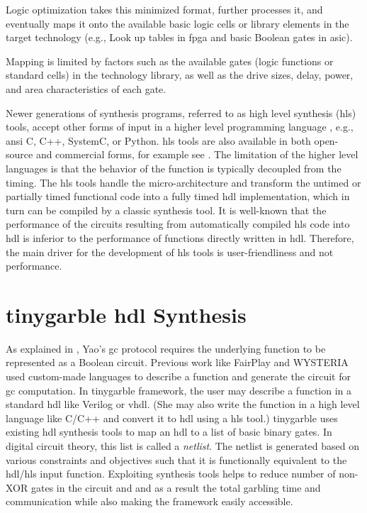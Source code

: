Logic optimization takes this minimized format, further processes it, and eventually maps it onto the available basic logic cells or library elements in the target technology (e.g., Look up tables in \acrshort{fpga} and basic Boolean gates in \acrshort{asic}).

Mapping is limited by factors such as the available gates (logic functions or standard cells) in the technology library, as well as the drive sizes, delay, power, and area characteristics of each gate.

Newer generations of synthesis programs, referred to as high level synthesis (\acrshort{hls}) tools, accept other forms of input in a higher level programming language \cite{Chapter:Zhang2008,chu1989hyper,corazao1996performance}, e.g., \acrshort{ansi} C, C++, SystemC, or Python.
\acrshort{hls} tools are also available in both open-source and commercial forms, for example see \cite{tool:Vivado,decaluwe2004myhdl,tool:PandA}.
The limitation of the higher level languages is that the behavior of the function is typically decoupled from the timing.
The \acrshort{hls} tools handle the micro-architecture and transform the untimed or partially timed functional code into a fully timed \acrshort{hdl} implementation, which in turn can be compiled by a classic synthesis tool.
It is well-known that the performance of the circuits resulting from automatically compiled \acrshort{hls} code into \acrshort{hdl} is inferior to the performance of functions directly written in \acrshort{hdl}.
Therefore, the main driver for the development of \acrshort{hls} tools is user-friendliness and not performance.

\section{\gls{tinygarble} \acrshort{hdl} Synthesis}\label{sec:syn-tiny}
As explained in , Yao's \acrshort{gc} protocol requires the underlying function to be represented as a Boolean circuit.
Previous work like FairPlay \cite{malkhi2004fairplay} and WYSTERIA \cite{rastogi2014wysteria} used custom-made languages to describe a function and generate the circuit for \acrshort{gc} computation.
In \gls{tinygarble} framework, the user may describe a function in a standard \acrshort{hdl} like Verilog or \acrshort{vhdl}.
(She may also write the function in a high level language like C/C++ and convert it to \acrshort{hdl} using a \acrshort{hls} tool.)
\gls{tinygarble} uses existing \acrshort{hdl} synthesis tools to map an \acrshort{hdl} to a list of basic binary gates.
In digital circuit theory, this list is called a \emph{netlist}.
The netlist is generated based on various constraints and objectives such that it is functionally equivalent to the \acrshort{hdl}/\acrshort{hls} input function.
Exploiting synthesis tools helps to reduce number of non-XOR gates in the circuit and and as a result the total garbling time and communication while also making the framework easily accessible.

